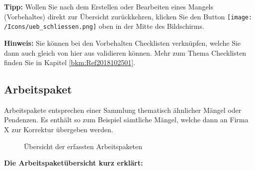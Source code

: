 \vspace{\baselineskip}

\textbf{Tipp:} Wollen Sie nach dem Erstellen oder Bearbeiten eines Mangels (Vorbehaltes) direkt zur Übersicht zurückkehren, klicken Sie den Button \texttt{[image: /Icons/ueb\_schliessen.png]} oben in der Mitte des Bildschirms.

\vspace{\baselineskip}

\textbf{Hinweis:} Sie können bei den Vorbehalten Checklisten verknüpfen, welche Sie dann auch gleich von hier aus validieren können. Mehr zum Thema Checklisten finden Sie in Kapitel \ref{bkm:Ref2018102501}.

\pagebreak
\subsection{Arbeitspaket}

Arbeitspakete entsprechen einer Sammlung thematisch ähnlicher Mängel oder Pendenzen. Es enthält so zum Beispiel sämtliche Mängel, welche dann an Firma X zur Korrektur übergeben werden.

\begin{figure}[H]
\caption{Übersicht der erfassten Arbeitspaketen}
\end{figure}

\textbf{Die Arbeitspaketübersicht kurz erklärt:}

\vspace{\baselineskip}

